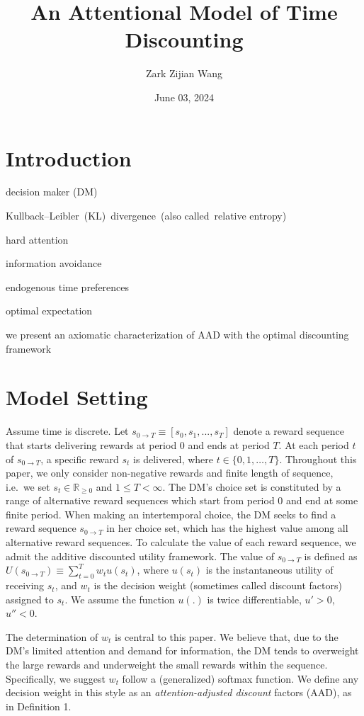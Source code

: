 \documentclass[
  12pt,
]{article}
\title{An Attentional Model of Time Discounting}
\author{Zark Zijian Wang}
\date{June 03, 2024}
\begin{document}
\maketitle

\hypertarget{introduction}{%
\section{Introduction}\label{introduction}}

decision maker (DM)

Kullback--Leibler~(KL)~divergence~(also called~relative entropy)

hard attention

information avoidance

endogenous time preferences

optimal expectation

we present an axiomatic characterization of AAD with the optimal
discounting framework

\hypertarget{model-setting}{%
\section{Model Setting}\label{model-setting}}

Assume time is discrete. Let
\(s_{0\rightarrow T}\equiv[s_0,s_1,...,s_T]\) denote a reward sequence
that starts delivering rewards at period 0 and ends at period \(T\). At
each period \(t\) of \(s_{0\rightarrow T}\), a specific reward \(s_t\)
is delivered, where \(t\in\{0,1,…,T\}\). Throughout this paper, we only
consider non-negative rewards and finite length of sequence, i.e.~we set
\(s_t \in \mathbb{R}_{\geq 0}\) and \(1\leq T<\infty\). The DM's choice
set is constituted by a range of alternative reward sequences which
start from period 0 and end at some finite period. When making an
intertemporal choice, the DM seeks to find a reward sequence
\(s_{0\rightarrow T}\) in her choice set, which has the highest value
among all alternative reward sequences. To calculate the value of each
reward sequence, we admit the additive discounted utility framework. The
value of \(s_{0\rightarrow T}\) is defined as
\(U(s_{0\rightarrow T})\equiv \sum_{t=0}^T w_{t}u(s_t)\), where
\(u(s_t)\) is the instantaneous utility of receiving \(s_t\), and
\(w_t\) is the decision weight (sometimes called discount factors)
assigned to \(s_t\). We assume the function \(u(.)\) is twice
differentiable, \(u'>0\), \(u''<0\).

The determination of \(w_t\) is central to this paper. We believe that,
due to the DM's limited attention and demand for information, the DM
tends to overweight the large rewards and underweight the small rewards
within the sequence. Specifically, we suggest \(w_t\) follow a
(generalized) softmax function. We define any decision weight in this
style as an \emph{attention-adjusted discount} factors (AAD), as in
Definition 1.
\end{document}
